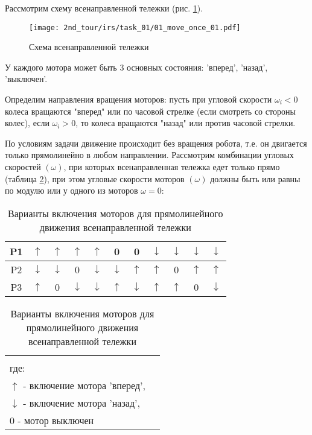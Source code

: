 \solutionSection

Рассмотрим схему всенаправленной тележки (рис. \ref{fig:01_move_once_01}).
\begin{figure}[h!]
	\centering
	\texttt{[image: 2nd\_tour/irs/task\_01/01\_move\_once\_01.pdf]}
	\caption{Схема всенаправленной тележки}
	\label{fig:01_move_once_01}
\end{figure}

У каждого мотора может быть 3 основных состояния: 'вперед', 'назад', 'выключен'.

Определим направления вращения моторов: пусть при угловой скорости $\omega_i < 0$ колеса вращаются "вперед" или по часовой стрелке (если смотреть со стороны колес), если $\omega_i > 0$, то колеса вращаются "назад" или против часовой стрелки.

По условиям задачи движение происходит без вращения робота, т.е. он двигается только прямолинейно в любом направлении. Рассмотрим комбинации угловых скоростей $(\omega)$, при которых всенаправленная тележка едет только прямо (таблица \ref{table:01_move_once_01}), при этом угловые скорости моторов $(\omega)$ должны быть или равны по модулю или у одного из моторов $\omega = 0$:

\begin{table}[h!]
	\begin{center}
	\begin{tabular}{|c|c|c|c|c|c|c|c|c|c|c|}
		\hline
		P1 & $\uparrow$ & $\uparrow$ & $\uparrow$ & $\uparrow$ & 0 & 0 & $\downarrow$ & $\downarrow$ & $\downarrow$ & $\downarrow$ \\
		\hline
		P2 & $\downarrow$ & $\downarrow$ & 0 & $\downarrow$ & $\downarrow$ & $\uparrow$ & $\uparrow$ & 0 & $\uparrow$ & $\uparrow$\\
		\hline
		P3 & $\uparrow$ & 0 & $\downarrow$ & $\downarrow$ & $\uparrow$ & $\downarrow$ & $\uparrow$ & $\uparrow$ & 0 & $\downarrow$\\
		\hline
	\end{tabular}

	\begin{tabular}{c|c|c|c|c|c|c|c|c|c|c|c}
		\multicolumn{11}{c}{} \\
		\multicolumn{11}{l}{где:} \\
		\multicolumn{11}{l}{$\uparrow$ - включение мотора 'вперед',} \\
		\multicolumn{11}{l}{$\downarrow$ - включение мотора 'назад',} \\
		\multicolumn{11}{l}{$0$ - мотор выключен} \\
	\end{tabular} 
	\caption{Варианты включения моторов для прямолинейного движения всенаправленной тележки}
	\label{table:01_move_once_01}
	\end{center}
\end{table}


